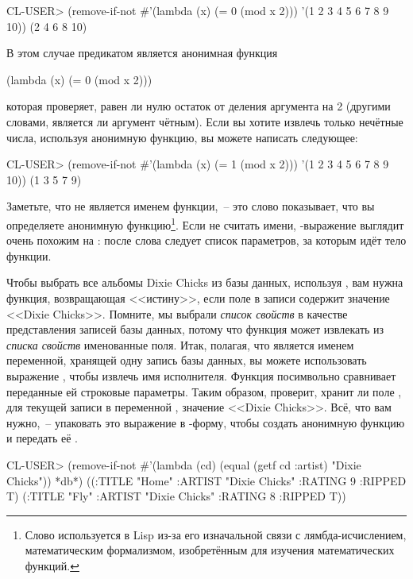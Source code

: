 \begin{myverb}
  CL-USER> (remove-if-not #'(lambda (x) (= 0 (mod x 2))) '(1 2 3 4 5 6 7 8 9 10))
  (2 4 6 8 10)
\end{myverb}

В этом случае предикатом является анонимная функция

\begin{myverb}
(lambda (x) (= 0 (mod x 2)))
\end{myverb}

\noindent{}которая проверяет, равен ли нулю остаток от деления аргумента на 2 (другими словами,
является ли аргумент чётным). Если вы хотите извлечь только нечётные числа, используя
анонимную функцию, вы можете написать следующее:

\begin{myverb}
  CL-USER> (remove-if-not #'(lambda (x) (= 1 (mod x 2))) '(1 2 3 4 5 6 7 8 9 10))
  (1 3 5 7 9)
\end{myverb}

Заметьте, что  не является именем функции,~-- это слово показывает, что вы
определяете анонимную функцию\footnote{Слово  используется в Lisp из-за его
  изначальной связи с лямбда-исчислением, математическим формализмом, изобретённым для
  изучения математических функций.}. Если не считать имени, -выражение
выглядит очень похожим на : после слова  следует список
параметров, за которым идёт тело функции.

Чтобы выбрать все альбомы Dixie Chicks из базы данных, используя , вам
нужна функция, возвращающая <<истину>>, если поле в записи  содержит значение
<<Dixie Chicks>>. Помните, мы выбрали \textit{список свойств} в качестве представления
записей базы данных, потому что функция  может извлекать из \textit{списка
  свойств} именованные поля. Итак, полагая, что  является именем переменной,
хранящей одну запись базы данных, вы можете использовать выражение , чтобы извлечь имя исполнителя. Функция  посимвольно сравнивает
переданные ей строковые параметры. Таким образом,  проверит, хранит ли поле , для текущей записи в переменной ,
значение <<Dixie Chicks>>. Всё, что вам нужно,~-- упаковать это выражение в
-форму, чтобы создать анонимную функцию и передать её .

\begin{myverb}
  CL-USER> (remove-if-not
    #'(lambda (cd) (equal (getf cd :artist) "Dixie Chicks")) *db*)
  ((:TITLE "Home" :ARTIST "Dixie Chicks" :RATING 9 :RIPPED T)
   (:TITLE "Fly" :ARTIST "Dixie Chicks" :RATING 8 :RIPPED T))
\end{myverb}

